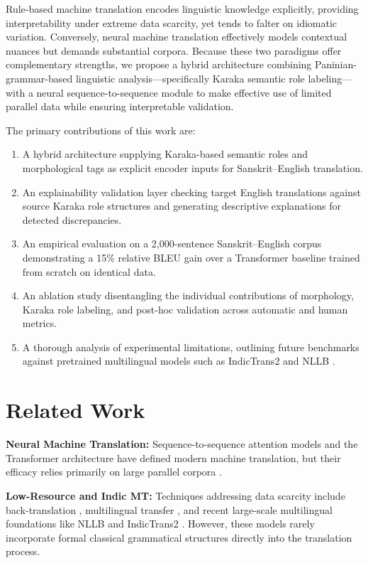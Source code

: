 \documentclass[11pt]{article}
\begin{document}
Rule-based machine translation encodes linguistic knowledge explicitly, providing interpretability under extreme data scarcity, yet tends to falter on idiomatic variation. Conversely, neural machine translation effectively models contextual nuances but demands substantial corpora. Because these two paradigms offer complementary strengths, we propose a hybrid architecture combining Paninian-grammar-based linguistic analysis---specifically Karaka semantic role labeling---with a neural sequence-to-sequence module to make effective use of limited parallel data while ensuring interpretable validation.

The primary contributions of this work are:
\begin{enumerate}
    \item A hybrid architecture supplying Karaka-based semantic roles and morphological tags as explicit encoder inputs for Sanskrit--English translation.
    \item An explainability validation layer checking target English translations against source Karaka role structures and generating descriptive explanations for detected discrepancies.
    \item An empirical evaluation on a 2,000-sentence Sanskrit--English corpus demonstrating a 15\% relative BLEU gain over a Transformer baseline trained from scratch on identical data.
    \item An ablation study disentangling the individual contributions of morphology, Karaka role labeling, and post-hoc validation across automatic and human metrics.
    \item A thorough analysis of experimental limitations, outlining future benchmarks against pretrained multilingual models such as IndicTrans2 \cite{gala2023indictrans2} and NLLB \cite{nllb2022}.
\end{enumerate}

\section{Related Work}
\textbf{Neural Machine Translation:} Sequence-to-sequence attention models \cite{bahdanau2015neural,sutskever2014sequence} and the Transformer architecture \cite{vaswani2017attention} have defined modern machine translation, but their efficacy relies primarily on large parallel corpora \cite{wu2016google,wolf2020transformers}.

\textbf{Low-Resource and Indic MT:} Techniques addressing data scarcity include back-translation \cite{sennrich2016improving}, multilingual transfer \cite{johnson2017google}, and recent large-scale multilingual foundations like NLLB \cite{nllb2022} and IndicTrans2 \cite{gala2023indictrans2}. However, these models rarely incorporate formal classical grammatical structures directly into the translation process.
\end{document}
